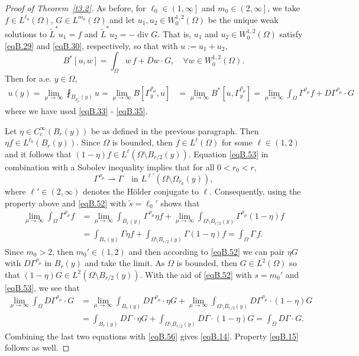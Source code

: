 \documentclass[12pt,reqno]{amsart}
\theoremstyle{plain}
\theoremstyle{definition}
\newenvironment{pf}
{\begin{proof}} {\end{proof}}
\DeclareMathOperator{\di}{div}
\newcommand{\Ga}{\Gamma}
\newcommand{\Om}{\Omega}
\newcommand{\iny}{\infty}
\newcommand{\brac}[1]{\left[#1\right]}
\newcommand{\pr}[1]{\left( #1 \right) }
\newcommand{\pb}[1]{\left( #1 \right] }
\begin{document}
\begin{appendix}
\begin{pf}[Proof of Theorem~\ref{t3.2}]
As before, for $\ell_0 \in \pb{1, \iny}$ and $m_0 \in \pb{2, \iny}$, we take $f\in L^{\ell_0}\pr{\Om}$, $G \in L^{m_0}\pr{\Om}$ and let $u_1, u_2 \in W^{1,2}_0\pr{\Om}$ be the unique weak solutions to ${\widetilde L}^* u_1 = f$ and ${\widetilde L}^* u_2 = - \di G$.
That is, $u_1$ and $u_2 \in W^{1,2}_0\pr{\Om}$ satisfy \eqref{eqB.29} and \eqref{eqB.30}, respectively, so that with $u := u_1 + u_2$,
$$B^*\brac{u, w} = \int_{\Om} w \, f + Dw \cdot G, \quad \forall w \in W^{1,2}_0\pr{\Om}.$$
Then for a.e. $y\in \Om$, 
\begin{align}
u(y)
=\lim_{\mu\to \infty} \fint_{B_{\rho_\mu}\pr{y}} u
= \lim_{\mu\to \infty} {B}\brac{\Ga^{\rho_\mu}_y, u}
&= \lim_{\mu\to \infty} {B}^*\brac{u, \Ga^{\rho_\mu}_y}
= \lim_{\mu\to \infty} \int_{\Om} \Ga^{\rho_\mu} f + D \Ga^{\rho_\mu} \cdot G
\label{eqB.56}
\end{align}
where we have used \eqref{eqB.33} - \eqref{eqB.35}.

Let $\eta \in C^\iny_c\pr{B_r\pr{y}}$ be as defined in the previous paragraph.
Then $\eta f \in L^{\ell_0}\pr{B_r\pr{y}}$.
Since $\Om$ is bounded, then $f \in L^\ell\pr{\Om}$ for some $\ell \in \pr{1, 2}$ and it follows that $\pr{1 - \eta}f  \in L^\ell\pr{\Om \setminus B_{r/2}\pr{y} }$.
Equation \eqref{eqB.53} in combination with a Sobolev inequality implies that for all $0 < r_0 < r$,
\begin{equation*}
\Ga^{\rho_{\mu}} \rightharpoonup \Ga \quad \text{in } L^{\ell'}\pr{\Om \setminus \Om_{r_0}\pr{y}},
\end{equation*}
where $\ell' \in \pr{2, \iny}$ denotes the H\"older conjugate to $\ell$.
Consequently, using the property above and \eqref{eqB.52} with $\tilde s = \ell_0'$ shows that
\begin{align*}
\lim_{\mu\to \infty} \int_{\Om} \Ga^{\rho_\mu} f
&= \lim_{\mu\to \infty}  \int_{B_r\pr{y}} \Ga^{\rho_\mu} \eta f
+ \lim_{\mu\to \infty}  \int_{\Om \setminus B_{r/2}\pr{y}} \Ga^{\rho_\mu} \pr{1 - \eta} f \\
&= \int_{B_r\pr{y}} \Ga \eta f
+  \int_{\Om \setminus B_{r/2}\pr{y}} \Ga \pr{1 - \eta} f
= \int_{\Om} \Ga \, f.
\end{align*}
Since $m_0 > 2$, then $m_0' \in \pr{1, 2}$ and then according to \eqref{eqB.52} we can pair $\eta G$ with $D \Ga^{\rho_\mu}$ in $B_r\pr{y}$ and take the limit.
As $\Om$ is bounded, then $G \in L^2\pr{\Om}$ so that $\pr{1 - \eta} G \in L^2\pr{\Om \setminus B_{r/2}\pr{y} }$.
With the aid of \eqref{eqB.52} with $s = m_0'$ and \eqref{eqB.53}, we see that
\begin{align*}
\lim_{\mu\to \infty} \int_{\Om} D\Ga^{\rho_\mu} \cdot G
&= \lim_{\mu\to \infty}  \int_{B_r\pr{y}} D\Ga^{\rho_\mu} \cdot \eta G 
+ \lim_{\mu\to \infty}  \int_{\Om \setminus B_{r/2}\pr{y}} D\Ga^{\rho_\mu} \cdot \pr{1 - \eta} G \\
&= \int_{B_r\pr{y}} D\Ga \cdot \eta G 
+  \int_{\Om \setminus B_{r/2}\pr{y}} D\Ga \cdot \pr{1 - \eta} G
= \int_{\Om} D\Ga \cdot G.
\end{align*}
Combining the last two equations with \eqref{eqB.56} gives \eqref{eqB.14}.
Property \eqref{eqB.15} follows as well.


\end{pf}
\end{appendix}
\end{document}
